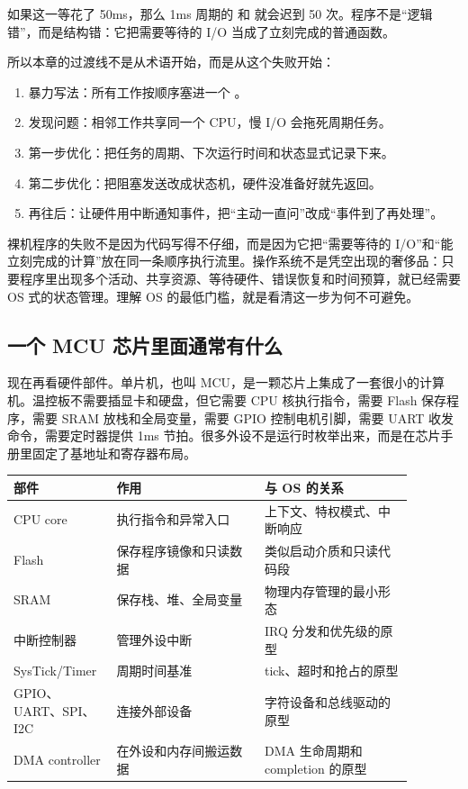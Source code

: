 如果这一等花了 50ms，那么 1ms 周期的  和  就会迟到 50 次。程序不是“逻辑错”，而是结构错：它把需要等待的 I/O 当成了立刻完成的普通函数。

所以本章的过渡线不是从术语开始，而是从这个失败开始：

\begin{enumerate}
\tightlist
\item 暴力写法：所有工作按顺序塞进一个 。
\item 发现问题：相邻工作共享同一个 CPU，慢 I/O 会拖死周期任务。
\item 第一步优化：把任务的周期、下次运行时间和状态显式记录下来。
\item 第二步优化：把阻塞发送改成状态机，硬件没准备好就先返回。
\item 再往后：让硬件用中断通知事件，把“主动一直问”改成“事件到了再处理”。
\end{enumerate}

\begin{keyidea}
裸机程序的失败不是因为代码写得不仔细，而是因为它把“需要等待的 I/O”和“能立刻完成的计算”放在同一条顺序执行流里。操作系统不是凭空出现的奢侈品：只要程序里出现多个活动、共享资源、等待硬件、错误恢复和时间预算，就已经需要 OS 式的状态管理。理解 OS 的最低门槛，就是看清这一步为何不可避免。
\end{keyidea}

\subsection{一个 MCU 芯片里面通常有什么}

现在再看硬件部件。单片机，也叫 MCU，是一颗芯片上集成了一套很小的计算机。温控板不需要插显卡和硬盘，但它需要 CPU 核执行指令，需要 Flash 保存程序，需要 SRAM 放栈和全局变量，需要 GPIO 控制电机引脚，需要 UART 收发命令，需要定时器提供 1ms 节拍。很多外设不是运行时枚举出来，而是在芯片手册里固定了基地址和寄存器布局。

\begin{longtable}{p{0.2\linewidth}p{0.34\linewidth}p{0.34\linewidth}}
\toprule
部件 & 作用 & 与 OS 的关系 \\
\midrule
CPU core & 执行指令和异常入口 & 上下文、特权模式、中断响应 \\
Flash & 保存程序镜像和只读数据 & 类似启动介质和只读代码段 \\
SRAM & 保存栈、堆、全局变量 & 物理内存管理的最小形态 \\
中断控制器 & 管理外设中断 & IRQ 分发和优先级的原型 \\
SysTick/Timer & 周期时间基准 & tick、超时和抢占的原型 \\
GPIO、UART、SPI、I2C & 连接外部设备 & 字符设备和总线驱动的原型 \\
DMA controller & 在外设和内存间搬运数据 & DMA 生命周期和 completion 的原型 \\
\bottomrule
\end{longtable}

